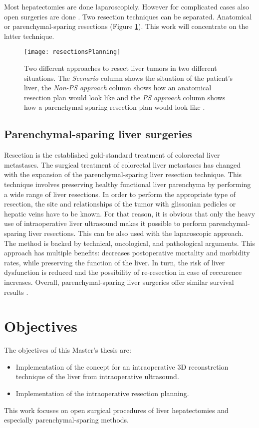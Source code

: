 Most hepatectomies are done laparoscopicly. However for complicated
cases also open surgeries are done \cite{cherqui2000laparoscopic}. Two
resection techniques can be separated. Anatomical or parenchymal-sparing
resections (Figure \ref{fig:resectionsPlanning}). This work will concentrate on the latter technique. 
\begin{figure}[H]
  \centering
 \texttt{[image: resectionsPlanning]}
  \caption{Two different approaches to resect liver tumors in two different
    situations. The \textit{Scenario} column shows the situation of the
    patient's liver, the \textit{Non-PS approach} column shows how an anatomical
  resection plan would look like and the \textit{PS approach} column shows how a
parenchymal-sparing resection plan would look like \cite{alvarez2016parenchymal}.}
  \label{fig:resectionsPlanning}
\end{figure}


\subsection{Parenchymal-sparing liver surgeries}
Resection is the established gold-standard treatment of colorectal liver
metastases. The surgical treatment of colorectal liver metastases has changed with the expansion of the
parenchymal-sparing liver resection technique. This technique involves preserving healthy
functional liver parenchyma by performing a wide range of liver resections. In
order to perform the appropriate type of resection, the site and
relationships of the tumor with glissonian pedicles or hepatic veins have to be
known.
For that reason, it is obvious that only the heavy use of intraoperative liver
ultrasound makes it possible to perform parenchymal-sparing liver resections.
This can be also used with the laparoscopic approach. The method is backed by technical, oncological,
and pathological arguments.
This approach has multiple benefits: decreases postoperative mortality and
morbidity rates, while preserving the function of the liver. In turn, the risk
of liver dysfunction is reduced and the possibility of re-resection in case of
reccurence increases. Overall, parenchymal-sparing liver surgeries offer
similar survival results \cite{Ferrero2017}.
\section{Objectives} 
The objectives of this Master's thesis are:
\begin{itemize}
  \item Implementation of the concept for an intraoperative 3D reconstrction
  technique of the liver from intraoperative ultrasound. 
  \item Implementation of the intraoperative resection planning.
\end{itemize}
This work focuses on open surgical procedures of liver hepatectomies and
especially parenchymal-sparing methods.



\endinput
